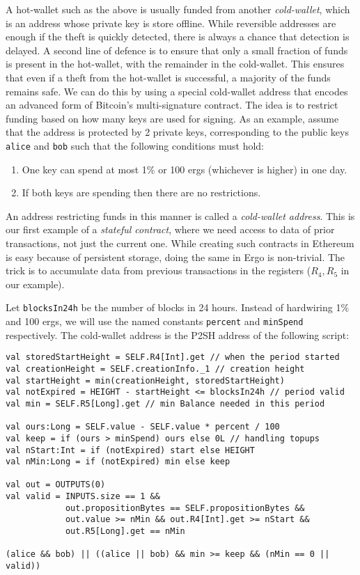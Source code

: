 \documentclass[runningheads]{llncs}
\begin{document}
\label{cold-wallet}

A hot-wallet such as the above is usually funded from another {\em cold-wallet}, which is an address whose private key is store offline. While reversible addresses are enough if the theft is quickly detected, there is always a chance that detection is delayed. A second line of defence is to ensure that only a small fraction of funds is present in the hot-wallet, with the remainder in the cold-wallet. This ensures that even if a theft from the hot-wallet is successful, a majority of the funds remains safe. We can do this by using a special cold-wallet address that encodes an advanced form of Bitcoin's multi-signature contract. 
The idea is to restrict funding based on how many keys are used for signing. As an example, assume that the address is protected by 2 private keys, corresponding to the public keys \texttt{alice} and \texttt{bob} such that the following conditions must hold:

\begin{enumerate}
	\item One key can spend at most 1\% or 100 ergs (whichever is higher) in one day.
	\item If both keys are spending then there are no restrictions. 
\end{enumerate}

An address restricting funds in this manner is called a {\em cold-wallet address}. 
This is our first example of a {\em stateful contract}, where we need access to 
data of prior transactions, not just the current one. While creating such contracts in Ethereum is easy because of persistent storage, doing the same in Ergo is non-trivial.
The trick is to accumulate data from previous transactions in the registers ($R_4, R_5$ in our example).

Let \texttt{blocksIn24h} be the number of blocks in 24 hours. Instead of hardwiring 1\% and 100 ergs, we will use the named constants \texttt{percent} and \texttt{minSpend} respectively. The cold-wallet address is the P2SH address of the following script:
\begin{verbatim}
val storedStartHeight = SELF.R4[Int].get // when the period started
val creationHeight = SELF.creationInfo._1 // creation height
val startHeight = min(creationHeight, storedStartHeight) 
val notExpired = HEIGHT - startHeight <= blocksIn24h // period valid
val min = SELF.R5[Long].get // min Balance needed in this period

val ours:Long = SELF.value - SELF.value * percent / 100
val keep = if (ours > minSpend) ours else 0L // handling topups
val nStart:Int = if (notExpired) start else HEIGHT
val nMin:Long = if (notExpired) min else keep

val out = OUTPUTS(0)  
val valid = INPUTS.size == 1 && 
            out.propositionBytes == SELF.propositionBytes &&
            out.value >= nMin && out.R4[Int].get >= nStart && 
            out.R5[Long].get == nMin
 
(alice && bob) || ((alice || bob) && min >= keep && (nMin == 0 || valid))
\end{verbatim}
\end{document}
